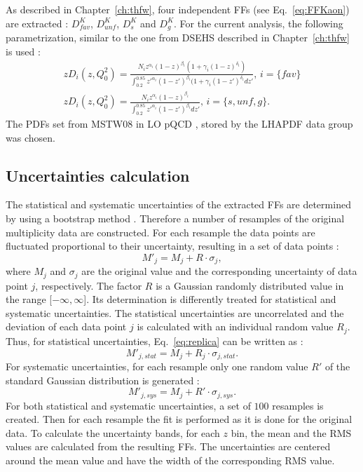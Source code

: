 As described in Chapter~\ref{ch:thfw}, four independent FFs (see Eq.~\ref{eq:FFKaon}) are extracted : $D^K_{fav}$, $D^K_{unf}$, $D^K_{s}$ and $D^K_{g}$.
For the current analysis, the following parametrization, similar to the one from DSEHS described in Chapter~\ref{ch:thfw} is used :
%
\begin{equation}
  \begin{split}
    zD_i(z,Q^2_0) = \frac{N_i z^{\alpha_i} (1-z)^{\beta_i} (1+\gamma_i(1-z)^{\delta_i})}{\int_{0.2}^{0.85} z'^{\alpha_i} (1-z')^{\beta_i} (1+\gamma_i(1-z')^{\delta_i} dz'},\,i=\{fav\} \\
    zD_i(z,Q^2_0) = \frac{N_i z^{\alpha_i} (1-z)^{\beta_i}}{\int_{0.2}^{0.85} z'^{\alpha_i} (1-z')^{\beta_i} dz'},\,i=\{s,unf,g\}.
  \end{split}
\end{equation}
%
The PDFs set from MSTW$08$ in LO pQCD \cite{MSTW08}, stored by the LHAPDF data group \cite{LHAPDF} was chosen.

\subsection{Uncertainties calculation}

The statistical and systematic uncertainties of the extracted FFs are determined by using a bootstrap method \cite{replicas}. Therefore a number of resamples of the original multiplicity data are constructed. For each resample the data points are fluctuated proportional to their uncertainty, resulting in a set of data points :
%
\begin{equation}\label{eq:replica}
  M'_j = M_j + R \cdot \sigma_j,
\end{equation}
%
where $M_j$ and $\sigma_j$ are the original value and the corresponding uncertainty of data point $j$, respectively. The factor $R$ is a Gaussian randomly distributed value in the range [$-\infty,\infty$]. Its determination is differently treated for statistical and systematic uncertainties.
The statistical uncertainties are uncorrelated and the deviation of each data point $j$ is calculated with an individual random value $R_j$. Thus, for statistical uncertainties, Eq.~\ref{eq:replica} can be written as :
%
\begin{equation}\label{eq:replica}
  M'_{j,stat} = M_j + R_j \cdot \sigma_{j,stat}.
\end{equation}
%
For systematic uncertainties, for each resample only one random value $R'$ of the standard Gaussian distribution is generated :
%
\begin{equation}\label{eq:replica}
  M'_{j,sys} = M_j + R' \cdot \sigma_{j,sys}.
\end{equation}
%
For both statistical and systematic uncertainties, a set of $100$ resamples is created. Then for each resample the fit is performed as it is done for the original data. To calculate the uncertainty bands, for each $z$ bin, the mean and the RMS values are calculated from the resulting FFs. The uncertainties are centered around the mean value and have the width of the corresponding RMS value.

